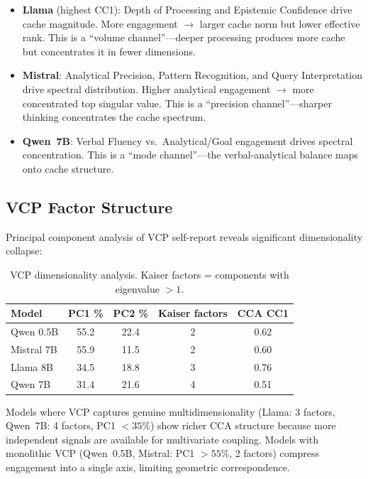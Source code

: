 \documentclass[11pt,a4paper]{article}
\begin{document}
\begin{itemize}
    \item \textbf{Llama} (highest CC1): Depth of Processing and Epistemic Confidence drive cache magnitude. More engagement $\to$ larger cache norm but lower effective rank. This is a ``volume channel''---deeper processing produces more cache but concentrates it in fewer dimensions.

    \item \textbf{Mistral}: Analytical Precision, Pattern Recognition, and Query Interpretation drive spectral distribution. Higher analytical engagement $\to$ more concentrated top singular value. This is a ``precision channel''---sharper thinking concentrates the cache spectrum.

    \item \textbf{Qwen~7B}: Verbal Fluency vs.\ Analytical/Goal engagement drives spectral concentration. This is a ``mode channel''---the verbal-analytical balance maps onto cache structure.
\end{itemize}

\subsection{VCP Factor Structure}

Principal component analysis of VCP self-report reveals significant dimensionality collapse:

\begin{table}[H]
\centering
\caption{VCP dimensionality analysis. Kaiser factors = components with eigenvalue $> 1$.}
\label{tab:vcp_factors}
\begin{tabular}{lcccc}
\toprule
\textbf{Model} & \textbf{PC1 \%} & \textbf{PC2 \%} & \textbf{Kaiser factors} & \textbf{CCA CC1} \\
\midrule
Qwen 0.5B  & 55.2 & 22.4 & 2 & 0.62 \\
Mistral 7B & 55.9 & 11.5 & 2 & 0.60 \\
Llama 8B   & 34.5 & 18.8 & 3 & 0.76 \\
Qwen 7B    & 31.4 & 21.6 & 4 & 0.51 \\
\bottomrule
\end{tabular}
\end{table}

Models where VCP captures genuine multidimensionality (Llama: 3 factors, Qwen~7B: 4 factors, PC1 $< 35\%$) show richer CCA structure because more independent signals are available for multivariate coupling. Models with monolithic VCP (Qwen~0.5B, Mistral: PC1 $> 55\%$, 2 factors) compress engagement into a single axis, limiting geometric correspondence.
\end{document}
